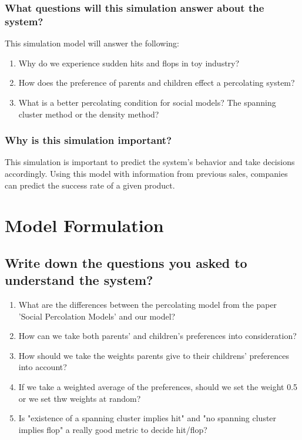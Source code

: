 \documentclass[article, 11pt, a4paper, onesize]{memoir}
\begin{document}
\subsection{What questions will this simulation answer about the system?}

This simulation model will answer the following:

\begin{enumerate}
    \item Why do we experience sudden hits and flops in toy industry?
    \item How does the preference of parents and children effect a percolating system?
    \item What is a better percolating condition for social models? The spanning cluster
        method or the density method?
\end{enumerate}

\subsection{Why is this simulation important?}

This simulation is important to predict the system's behavior and take decisions
accordingly. Using this model with information from previous sales, companies can predict
the success rate of a given product.

\newpage
\chapter{Model Formulation}

\section{Write down the questions you asked to understand the system?}

\begin{enumerate}
\item What are the differences between the percolating model from the paper 'Social
    Percolation Models' and our model?  
\item How can we take both parents' and children's preferences into consideration?  
\item How should we take the weights parents give to their childrens' preferences into
    account?
\item If we take a weighted average of the preferences, should we set the weight 0.5 or we
    set thw weights at random?  
\item Is "existence of a spanning cluster implies hit" and "no spanning cluster implies
    flop" a really good metric to decide hit/flop?
\end{enumerate}
\end{document}
